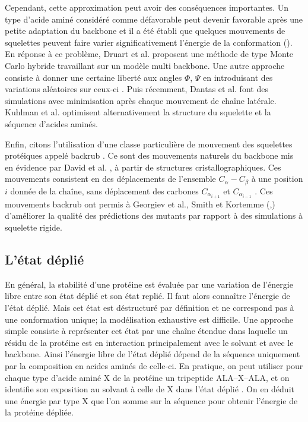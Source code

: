 Cependant, cette approximation peut avoir des conséquences importantes. Un type d'acide aminé considéré comme défavorable peut devenir favorable après une petite adaptation du backbone et il a été établi que quelques mouvements de squelettes peuvent faire varier significativement l'énergie de la conformation (\cite{Desjarlais99}).
En réponse à ce problème, Druart et al. \cite{Druart16} proposent une méthode de type Monte Carlo hybride travaillant sur un modèle multi backbone. Une autre approche consiste à donner une certaine liberté aux angles $\Phi$, $\Psi$ en introduisant des variations aléatoires sur ceux-ci \cite{Desjarlais99}. Puis récemment, Dantas et al. \cite{Dantas07} font des simulations avec minimisation après chaque mouvement de chaîne latérale. Kuhlman et al. \cite{Kuhlman03}  optimisent alternativement la structure du squelette et la séquence d'acides aminés.

Enfin, citons l'utilisation d'une classe particulière de mouvement des squelettes protéiques appelé \og backrub \fg. Ce sont des mouvements naturels du backbone mis en évidence par David et al. \cite{Davis06}, à partir de structures cristallographiques. Ces mouvements consistent en des déplacements de l'ensemble $C_{\alpha}-C_{\beta}$ à une position $i$ donnée de la chaîne, sans déplacement des carbones $C_{\alpha_{i+1}}$ et $C_{\alpha_{i-1}}$ . Ces mouvements backrub ont permis à Georgiev et al., Smith et Kortemme (\cite{Georgiev08},\cite{Smith08}) d'améliorer la qualité des prédictions des mutants par rapport à des simulations à squelette rigide.

\subsection{L'état déplié }
\label{sub:deplie}
En général, la stabilité d'une protéine est évaluée par une variation de l'énergie libre entre son état déplié et son état replié. Il faut alors connaître l'énergie de l'état déplié. Mais cet état est déstructuré par définition et ne correspond pas à une conformation unique; la modélisation exhaustive est difficile. Une approche simple consiste à représenter cet état par une chaîne étendue dans laquelle un résidu de la protéine est en interaction principalement avec le solvant et avec le backbone. Ainsi l'énergie libre de l'état déplié dépend de la séquence uniquement par la composition en acides aminés de celle-ci. En pratique, on peut utiliser pour chaque type d'acide aminé X de la protéine  un tripeptide ALA--X--ALA, et on identifie son exposition au solvant à celle de X dans l'état déplié \cite{Dahiyat96}. On en déduit une énergie par type X que l'on somme sur la séquence pour obtenir l'énergie de la protéine dépliée. 

